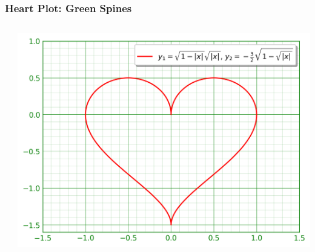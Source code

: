 \documentclass[xcolor={svgnames}]{beamer}
\newcommand{\pyfile}[2][]{}
\begin{document}
\begin{frame}[t,fragile]
    \frametitle{Heart Plot: Green Spines}
    \vspace{-2mm}
    \begin{columns}[T]
        \begin{column}{0.47\textwidth}
            \pyfile[style=tiny,linerange=30]{examples/heart-6.py}
        \end{column}
        \begin{column}{0.53\textwidth}
            \includegraphics[width=\textwidth]{img/heart-6.png}
        \end{column}
    \end{columns}
\end{frame}
\end{document}
